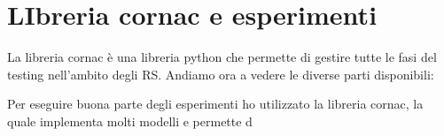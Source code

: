 \hypertarget{(chap:capitolo6)}{}
\chapter{LIbreria cornac e esperimenti}
La libreria cornac è una libreria python che permette di gestire tutte le fasi del testing nell'ambito degli RS.
Andiamo ora a vedere le diverse parti disponibili:

Per eseguire buona parte degli esperimenti ho utilizzato la libreria cornac, la quale implementa molti modelli e permette d